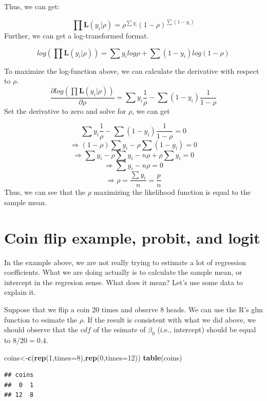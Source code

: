 \documentclass[
]{book}
\newenvironment{Shaded}{\begin{snugshade}}{\end{snugshade}}
\newcommand{\DataTypeTok}[1]{\textcolor[rgb]{0.13,0.29,0.53}{#1}}
\newcommand{\DecValTok}[1]{\textcolor[rgb]{0.00,0.00,0.81}{#1}}
\newcommand{\KeywordTok}[1]{\textcolor[rgb]{0.13,0.29,0.53}{\textbf{#1}}}
\newcommand{\NormalTok}[1]{#1}
\begin{document}
Thus, we can get:

\[\prod \mathbf{L}(y_i|\rho)=\rho^{\sum y_i}(1-\rho)^{\sum(1-y_i)}\]
Further, we can get a log-transformed format.

\[log (\prod \mathbf{L}(y_i|\rho))=\sum y_i log \rho + \sum(1-y_i) log(1-\rho)\]

To maximize the log-function above, we can calculate the derivative with respect to \(\rho\).
\[\frac{\partial log (\prod \mathbf{L}(y_i|\rho)) }{\partial \rho}=\sum y_i \frac{1}{\rho}-\sum(1-y_i) \frac{1}{1-\rho}\]
Set the derivative to zero and solve for \(\rho\), we can get

\[\sum y_i \frac{1}{\rho}-\sum(1-y_i) \frac{1}{1-\rho}=0\]
\[\Rightarrow (1-\rho)\sum y_i - \rho \sum(1-y_i) =0\]
\[\Rightarrow \sum y_i-\rho\sum y_i - n\rho +\rho\sum y_i =0\]
\[\Rightarrow \sum y_i - n\rho  =0\]
\[\Rightarrow \rho  = \frac{\sum y_i}{n}=\frac{p}{n}\]
Thus, we can see that the \(\rho\) maximizing the likelihood function is equal to the sample mean.

\hypertarget{coin-flip-example-probit-and-logit}{%
\section{Coin flip example, probit, and logit}\label{coin-flip-example-probit-and-logit}}

In the example above, we are not really trying to estimate a lot of regression coefficients. What we are doing actually is to calculate the sample mean, or intercept in the regresion sense. What does it mean? Let's use some data to explain it.

Suppose that we flip a coin 20 times and observe 8 heads. We can use the R's glm function to esimate the \(\rho\). If the result is consistent with what we did above, we should observe that the \(cdf\) of the esimate of \(\beta_0\) (i.e., intercept) should be equal to \(8/20=0.4\).

\begin{Shaded}
\begin{Highlighting}[]
\NormalTok{coins<-}\KeywordTok{c}\NormalTok{(}\KeywordTok{rep}\NormalTok{(}\DecValTok{1}\NormalTok{,}\DataTypeTok{times=}\DecValTok{8}\NormalTok{),}\KeywordTok{rep}\NormalTok{(}\DecValTok{0}\NormalTok{,}\DataTypeTok{times=}\DecValTok{12}\NormalTok{))}
\KeywordTok{table}\NormalTok{(coins)}
\end{Highlighting}
\end{Shaded}

\begin{verbatim}
## coins
##  0  1 
## 12  8
\end{verbatim}
\end{document}
